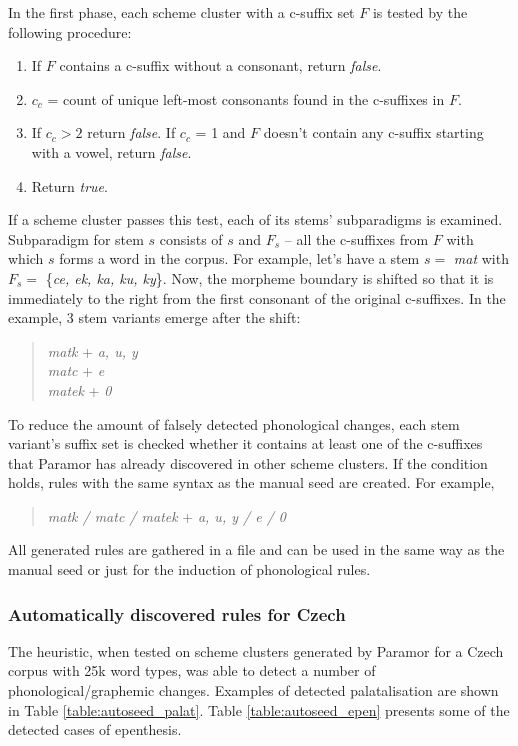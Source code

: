 In the first phase, each scheme cluster with a c-suffix set $F$ is tested by the following procedure:
\begin{enumerate}
\item If $F$ contains a c-suffix without a consonant, return \emph{false}.
\item $c_c$ = count of unique left-most consonants found in the c-suffixes in $F$.
\item If $c_c > 2$ return \emph{false}. If $c_c$ = 1 and $F$ doesn't contain any c-suffix starting with a vowel, return \emph{false}.
\item Return \emph{true}.
\end{enumerate}
If a scheme cluster passes this test, each of its stems' subparadigms is examined. Subparadigm for stem $s$ consists of $s$ and $F_s$ -- all the c-suffixes from $F$ with which $s$ forms a word in the corpus. For example, let's have a stem $s = $ \emph{mat} with $F_s = $ \{\emph{ce, ek, ka, ku, ky}\}. Now, the morpheme boundary is shifted so that it is immediately to the right from the first consonant of the original c-suffixes. In the  example, 3 stem variants emerge after the shift:\begin{quote}
\begin{flushleft}
\emph{matk} + \emph{a, u, y}\\
\emph{matc} + \emph{e}\\ 
\emph{matek} + \emph{0}\\
\end{flushleft}
\end{quote}
To reduce the amount of falsely detected phonological changes, each stem variant's suffix set is checked whether it contains at least one of the c-suffixes that Paramor has already discovered in other scheme clusters. If the condition holds, rules with the same syntax as the manual seed are created. For example, \begin{quote}\emph{matk / matc / matek} + \emph{a, u, y / e / 0}\end{quote} All generated rules are gathered in a file and can be used in the same way as the manual seed or just for the induction of phonological rules.

\subsubsection*{Automatically discovered rules for Czech}

The heuristic, when tested on scheme clusters generated by Paramor for a Czech corpus with 25k word types, was able to detect a number of phonological/graphemic changes. Examples of detected palatalisation are shown in Table \ref{table:autoseed_palat}. Table \ref{table:autoseed_epen} presents some of the detected cases of epenthesis.


